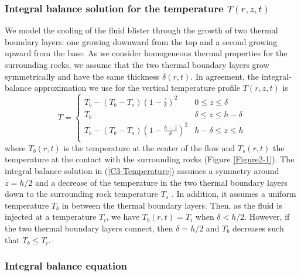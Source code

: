 \subsubsection{Integral   balance   solution   for   the   temperature
  $T(r,z,t)$}

We model  the cooling of the  fluid blister through the  growth of two
thermal  boundary layers:  one growing  downward  from the  top and  a
second  growing upward  from  the base.   As  we consider  homogeneous
thermal properties for  the surrounding rocks, we assume  that the two
thermal boundary layers grow symmetrically and have the same thickness
$\delta(r,t)$.   In agreement,  the integral-balance  approximation we
use for the vertical temperature profile $T(r,z,t)$ is
\begin{equation}
  T=
  \begin{cases}
    T_b - (T_b-T_s)(1-\frac{z}{\delta})^2 & 0 \le z\le \delta \\
    T_b & \delta \le z\le h-\delta \\
    T_b - (T_b-T_s)(1-\frac{h-z}{\delta})^2 & h-\delta \le z\le h\\
  \end{cases}
  \label{C3-Temperature}
\end{equation}
where $T_b(r,t)$  is the  temperature at  the center  of the  flow and
$T_s(r,t)$ the temperature  at the contact with  the surrounding rocks
(Figure   \ref{Figure2-1}).    The   integral  balance   solution   in
(\ref{C3-Temperature}) assumes  a symmetry around $z=h/2$  and a decrease
of the  temperature in  the two  thermal boundary  layers down  to the
surrounding  rock  temperature   $T_s$  \citep{BALMFORTH:2004fm}.   In
addition,  it  assumes a  uniform  temperature  $T_b$ in  between  the
thermal  boundary  layers.   Then,  as  the fluid  is  injected  at  a
temperature  $T_i$,   we  have  $T_b(r,t)  =T_i$   when  $\delta<h/2$.
However,   if  the   two   thermal  boundary   layers  connect,   then
$\delta = h/2$ and $T_b$ decreases such that $T_b\le T_i$.

\subsubsection{Integral balance equation}
\label{C3-sec:integr-balance-equat}

